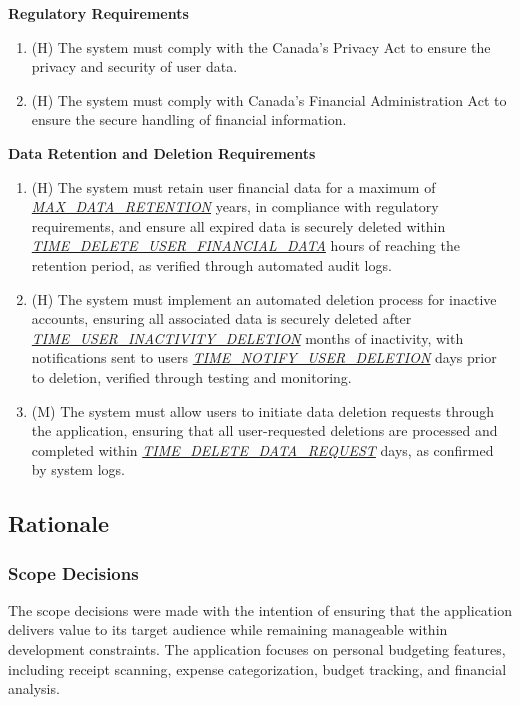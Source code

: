 \documentclass[12pt]{article}
\begin{document}
\textbf{Regulatory Requirements}\label{NFR-REG}
\begin{enumerate}[label=NFR-REG-\arabic*]
  \item (H) The system must comply with the Canada's Privacy Act to ensure the
  privacy and security of user data.
  \item (H) The system must comply with Canada's Financial Administration Act to
  ensure the secure handling of financial information.
\end{enumerate}

\textbf{Data Retention and Deletion Requirements}\label{NFR-DAT}
\begin{enumerate}[label=NFR-DAT-\arabic*]
\item (H) The system must retain user financial data for a maximum of
  \hyperref[Table:AuxConstants]{\textit{MAX\_DATA\_RETENTION}} years, in
  compliance with regulatory requirements, and ensure all expired data is
  securely deleted within
  \hyperref[Table:AuxConstants]{\textit{TIME\_DELETE\_USER\_FINANCIAL\_DATA}}
  hours of reaching the retention period, as verified through automated audit
  logs.
  \item (H) The system must implement an automated deletion process for inactive
  accounts, ensuring all associated data is securely deleted after
  \hyperref[Table:AuxConstants]{\textit{TIME\_USER\_INACTIVITY\_DELETION}}
  months of inactivity, with notifications sent to users
  \hyperref[Table:AuxConstants]{\textit{TIME\_NOTIFY\_USER\_DELETION}} days
  prior to deletion, verified through testing and monitoring.
  \item (M) The system must allow users to initiate data deletion requests
  through the application, ensuring that all user-requested deletions are
  processed and completed within
  \hyperref[Table:AuxConstants]{\textit{TIME\_DELETE\_DATA\_REQUEST}} days, as
  confirmed by system logs.
\end{enumerate}



\newpage

\subsection{Rationale}

\subsubsection{Scope Decisions}
The scope decisions were made with the intention of ensuring that the
application delivers value to its target audience while remaining manageable
within development constraints. The application focuses on personal budgeting
features, including receipt scanning, expense categorization, budget tracking,
and financial analysis. \\
\end{document}
